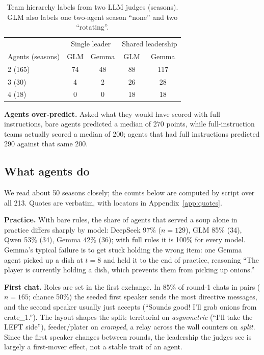 \documentclass{article}
\begin{document}
\begin{table}[h]
\centering\small
\begin{tabular}{lcccc}
\toprule
& \multicolumn{2}{c}{Single leader} & \multicolumn{2}{c}{Shared leadership}\\
Agents (seasons) & GLM & Gemma & GLM & Gemma\\
\midrule
2 (165) & 74 & 48 & 88 & 117\\
3 (30) & 4 & 2 & 26 & 28\\
4 (18) & 0 & 0 & 18 & 18\\
\bottomrule
\end{tabular}
\caption{Team hierarchy labels from two LLM judges (seasons). GLM also labels one two-agent season ``none'' and two ``rotating''.}
\label{tab:hier}
\end{table}

\textbf{Agents over-predict.} Asked what they would have scored with full instructions, bare agents predicted a median of 270 points, while full-instruction teams actually scored a median of 200; agents that had full instructions predicted 290 against that same 200.

\subsection{What agents do}\label{sec:qual}
We read about 50 seasons closely; the counts below are computed by script over all 213. Quotes are verbatim, with locators in Appendix~\ref{app:quotes}.

\textbf{Practice.} With bare rules, the share of agents that served a soup alone in practice differs sharply by model: DeepSeek 97\% ($n=129$), GLM 85\% (34), Qwen 53\% (34), Gemma 42\% (36); with full rules it is 100\% for every model. Gemma's typical failure is to get stuck holding the wrong item: one Gemma agent picked up a dish at $t=8$ and held it to the end of practice, reasoning ``The player is currently holding a dish, which prevents them from picking up onions.''

\textbf{First chat.} Roles are set in the first exchange. In 85\% of round-1 chats in pairs ($n=165$; chance 50\%) the seeded first speaker sends the most directive messages, and the second speaker usually just accepts (``Sounds good! I'll grab onions from crate\_1.''). The layout shapes the split: territorial on \emph{asymmetric} (``I'll take the LEFT side''), feeder/plater on \emph{cramped}, a relay across the wall counters on \emph{split}. Since the first speaker changes between rounds, the leadership the judges see is largely a first-mover effect, not a stable trait of an agent.
\end{document}
